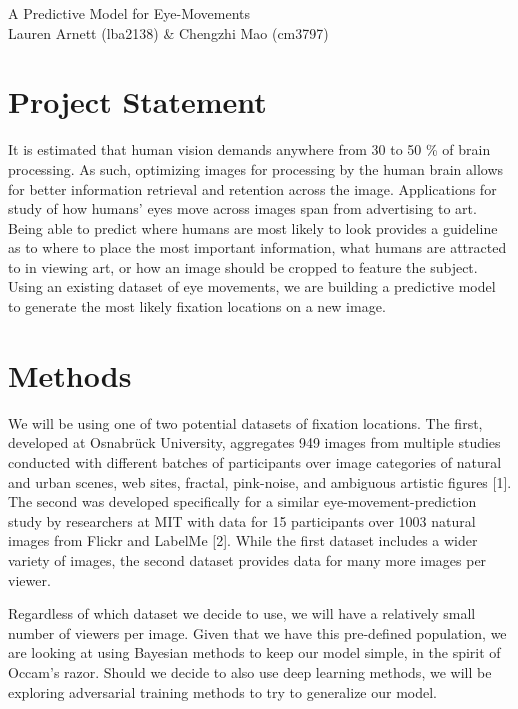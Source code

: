 \documentclass[11pt]{article}
\begin{document}
\begin{center}
    \LARGE {A Predictive Model for Eye-Movements}
    \\\large Lauren Arnett (lba2138) \& Chengzhi Mao (cm3797)
    
\end{center}
\section{Project Statement} 
\vspace{-0.25cm}
It is estimated that human vision demands anywhere from 30 to 50 \% of brain
processing. As such, optimizing images for processing by the human brain allows
for better information retrieval and retention across the image. Applications
for study of how humans' eyes move across images span from advertising to art.
Being able to predict where humans are most likely to look provides a guideline
as to where to place the most important information, what humans are attracted
to in viewing art, or how an image should be cropped to feature the subject.
Using an existing dataset of eye movements, we are building a predictive model
to generate the most likely fixation locations on a new image. 
\vspace{-0.5cm}

\section{Methods} 

\vspace{-0.25cm}
We will be using one of two potential datasets of fixation locations. The
first, developed at Osnabr{\"u}ck University, aggregates 949 images
from multiple studies conducted with different batches of participants over
image categories of natural and urban scenes, web sites, fractal, pink-noise,
and ambiguous artistic figures [1].  The second was developed specifically for
a similar eye-movement-prediction study by researchers at MIT with data for 15
participants over 1003 natural images from Flickr and LabelMe [2]. While the first
dataset includes a wider variety of images, the second dataset provides data
for many more images per viewer.

Regardless of which dataset we decide to use, we will have a relatively small
number of viewers per image. Given that we have this pre-defined population, we
are looking at using Bayesian methods to keep our model simple, in the spirit
of Occam's razor. Should we decide to also use deep learning methods, we
will be exploring adversarial training methods to try to generalize our model.
\end{document}
